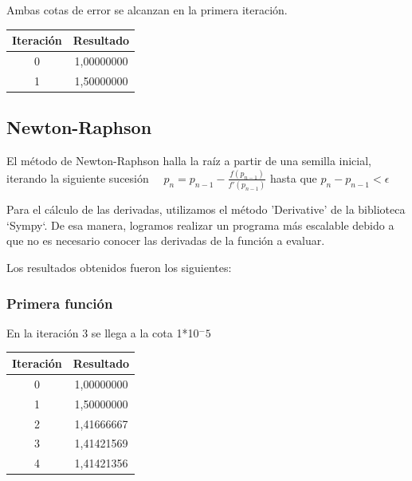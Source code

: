 \documentclass[titlepage,a4paper]{article}
\begin{document}
Ambas cotas de error se alcanzan en la primera iteración.

\begin{center}
    \begin{tabular}{| c | c |}
    \hline
     Iteración & Resultado \\ \hline
        0     & 1,00000000 \\
        1     & 1,50000000 \\
    \hline
    \end{tabular}
\end{center}
\subsection{Newton-Raphson}\label{sec:NewtonRaphson}
El método de Newton-Raphson halla la raíz a partir de una semilla inicial, iterando la siguiente sucesión
$\quad p_{n} =p_{n-1}-\frac{f (p_{n-1})}{f'(p_{n-1})}$ hasta que 
$p_{n}-p_{n-1} < \mbox{$\epsilon$}$


Para el cálculo de las derivadas, utilizamos el método 'Derivative' de la biblioteca `Sympy`. De esa manera, logramos realizar un programa más escalable debido a que no es necesario conocer las derivadas de la función a evaluar.

Los resultados obtenidos fueron los siguientes:

\subsubsection{Primera función}\label{sec:NR1}
En la iteración 3 se llega a la cota 1*10$^-5$
\begin{center}
\begin{tabular}{| c | c |}
\hline
 Iteración & Resultado \\ \hline
    0     & 1,00000000 \\
    1     & 1,50000000 \\
    2     & 1,41666667 \\
    3     & 1,41421569 \\
    4     & 1,41421356 \\
\hline
\end{tabular}
\end{center}
\end{document}
